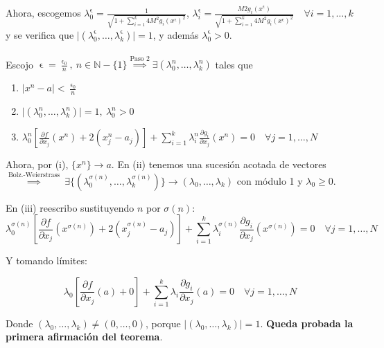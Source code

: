 \documentclass[11pt, a4paper]{article}
\makeatletter
\let\epsilon\upvarepsilon
\renewenvironment{proof}[1][\proofname] {\vspace{-15pt}\par\pushQED{\qed}\normalfont\topsep6\p@\@plus6\p@\relax\trivlist\item[\hskip\labelsep\it#1\@addpunct{.}]\ignorespaces}{\popQED\endtrivlist\@endpefalse}
\providecommand{\abs}[1]{\lvert#1\rvert}
\theoremstyle{theorem-style}
\theoremstyle{definition-style}
\theoremstyle{remark-style}
\theoremstyle{example-style}
\newenvironment{nlist}
{\begin{enumerate}
\renewcommand\labelenumi{(\emph{\roman{enumi})}}}
{\end{enumerate}}
\makeatother
\begin{document}
\begin{proof}[Demostración (método de penalización)]
	Ahora, escogemos $\lambda_0^{\epsilon} = \frac{1}{\sqrt{1+\sum_{i=1}^k 4M^2g_i(x^{\epsilon})^2}}$, $\lambda_i^{\epsilon} = \frac{M2g_i(x^{\epsilon})}{\sqrt{1+\sum_{i=1}^k 4M^2g_i(x^{\epsilon})^2}}\quad \forall i = 1,\dots,k$ y se verifica que $\abs{(\lambda_0^{\epsilon},\dots,\lambda_k^{\epsilon})} = 1$, y además $\lambda_0^\epsilon > 0$.\\
	
	\hfill\\
	Escojo $\epsilon=\frac{\epsilon_0}{n},\ n\in \mathbb{N}-\{1\} \stackrel{\text{Paso 2}}{\implies} \exists(\lambda_0^n,\dots,\lambda_k^n)$ tales que
	
	\begin{nlist}
	\item $\abs{x^n-a}<\frac{\epsilon_0}{n}$
	\item $\abs{(\lambda_0^n,\dots,\lambda_k^n)} = 1,\ \lambda_0^n>0$
	\item $\lambda_0^n\left[\frac{\partial f}{\partial x_j}(x^n)+2(x_j^n-a_j)\right]+\sum_{i=1}^k \lambda_i^n \frac{\partial g_i}{\partial x_j} (x^n) = 0 \quad \forall j=1,\dots,N$
\end{nlist}

Ahora, por (i), $\{x^n\}\to a$.
En (ii) tenemos una sucesión acotada de vectores\\ $\stackrel{\text{Bolz.-Weierstrass}}{\implies}\ \exists \{(\lambda_0^{\sigma(n)},\dots,\lambda_k^{\sigma(n)})\}\to (\lambda_0,\dots,\lambda_k)$ con módulo 1 y $\lambda_0 \ge 0$.

En (iii) reescribo sustituyendo $n$ por $\sigma(n)$:
\[
	\lambda_0^{\sigma(n)}\left[\frac{\partial f}{\partial x_j}(x^{\sigma(n)})+2(x_j^{\sigma(n)}-a_j)\right]+\sum_{i=1}^k \lambda_i^{\sigma(n)} \frac{\partial g_i}{\partial x_j} (x^{\sigma(n)}) = 0 \quad \forall j=1,\dots,N
\]

Y tomando límites:

\[
	\lambda_0\left[\frac{\partial f}{\partial x_j}(a)+0\right]+\sum_{i=1}^k \lambda_i \frac{\partial g_i}{\partial x_j} (a) = 0 \quad \forall j=1,\dots,N
\]

Donde $(\lambda_0,\dots,\lambda_k)\ne (0,\dots,0)$, porque $\abs{(\lambda_0,\dots,\lambda_k)} = 1$. \textbf{Queda probada la primera afirmación del teorema}.

\end{proof}
\end{document}
